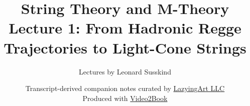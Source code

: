 \documentclass[11pt,oneside]{book}
\begin{document}
\hypersetup{pageanchor=false}
\frontmatter
\title{String Theory and M-Theory\\[0.45em]
\large Lecture 1: From Hadronic Regge Trajectories to Light-Cone Strings}
\author{Lectures by Leonard Susskind}
\date{Transcript-derived companion notes curated by
\href{https://lazying.art}{LazyingArt LLC}\\[0.35em]
\small Produced with
\href{https://github.com/lachlanchen/Video2Book}{Video2Book}}
\maketitle
\hypersetup{pageanchor=true}
\mainmatter

\end{document}
